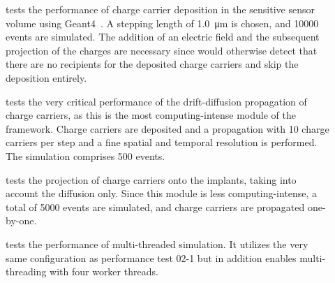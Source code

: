 \begin{description}
    \item[] tests the performance of charge carrier deposition in the sensitive sensor volume using Geant4~\cite{geant4}. A stepping length of \SI{1.0}{\um} is chosen, and \num{10000} events are simulated. The addition of an electric field and the subsequent projection of the charges are necessary since \apsq would otherwise detect that there are no recipients for the deposited charge carriers and skip the deposition entirely.
    \item[] tests the very critical performance of the drift-diffusion propagation of charge carriers, as this is the most computing-intense module of the framework. Charge carriers are deposited and a propagation with 10 charge carriers per step and a fine spatial and temporal resolution is performed. The simulation comprises \num{500} events.
    \item[] tests the projection of charge carriers onto the implants, taking into account the diffusion only. Since this module is less computing-intense, a total of \num{5000} events are simulated, and charge carriers are propagated one-by-one.
    \item[] tests the performance of multi-threaded simulation. It utilizes the very same configuration as performance test 02-1 but in addition enables multi-threading with four worker threads.
\end{description}
